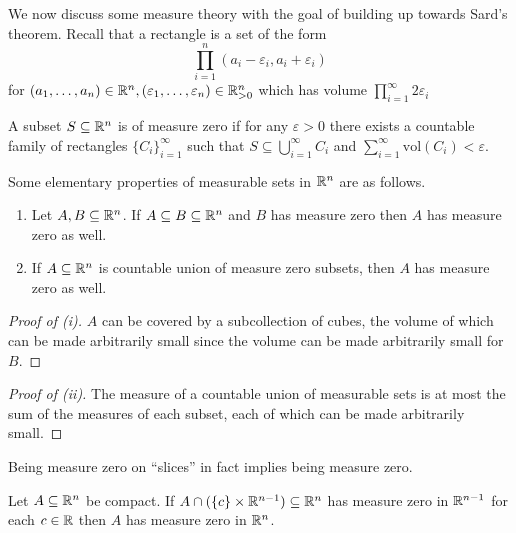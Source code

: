 We now discuss some measure theory with the goal of building up towards Sard's theorem. Recall that a rectangle is a set of the form 
$$\prod_{i=1}^{n}(a_{i}-\varepsilon_{i},a_{i}+\varepsilon_{i})$$
for $(a_{1},\dots,a_{n})\in\mathbb{R}^{n},(\varepsilon_{1},\dots,\varepsilon_{n})\in\mathbb{R}^{n}_{>0}$ which has volume $\prod_{i=1}^{\infty}2\varepsilon_{i}$
\begin{definition}\label{def: set of measure zero}
    A subset $S\subseteq\mathbb{R}^{n}$ is of measure zero if for any $\varepsilon>0$ there exists a countable family of rectangles $\{C_{i}\}_{i=1}^{\infty}$ such that $S\subseteq\bigcup_{i=1}^{\infty}C_{i}$ and $\sum_{i=1}^{\infty}\mathrm{vol}(C_{i})<\varepsilon$. 
\end{definition}
Some elementary properties of measurable sets in $\mathbb{R}^{n}$ are as follows. 
\begin{lemma}\label{lem: measurable sets}
    \begin{enumerate}[label=(\roman*)]
        \item Let $A,B\subseteq\mathbb{R}^{n}$. If $A\subseteq B\subseteq\mathbb{R}^{n}$ and $B$ has measure zero then $A$ has measure zero as well. 
        \item If $A\subseteq\mathbb{R}^{n}$ is countable union of measure zero subsets, then $A$ has measure zero as well. 
    \end{enumerate}
\end{lemma}
\begin{proof}[Proof of (i)]
    $A$ can be covered by a subcollection of cubes, the volume of which can be made arbitrarily small since the volume can be made arbitrarily small for $B$. 
\end{proof}
\begin{proof}[Proof of (ii)]
    The measure of a countable union of measurable sets is at most the sum of the measures of each subset, each of which can be made arbitrarily small. 
\end{proof}
Being measure zero on ``slices'' in fact implies being measure zero. 
\begin{lemma}\label{lem: measure zero slices imply measure zero space}
    Let $A\subseteq\mathbb{R}^{n}$ be compact. If $A\cap (\{c\}\times\mathbb{R}^{n-1})\subseteq\mathbb{R}^{n}$ has measure zero in $\mathbb{R}^{n-1}$ for each $c\in\mathbb{R}$ then $A$ has measure zero in $\mathbb{R}^{n}$. 
\end{lemma}
